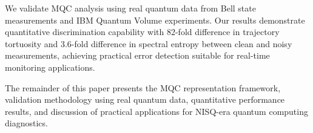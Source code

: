 We validate MQC analysis using real quantum data from Bell state measurements and IBM Quantum Volume experiments. Our results demonstrate quantitative discrimination capability with 82-fold difference in trajectory tortuosity and 3.6-fold difference in spectral entropy between clean and noisy measurements, achieving practical error detection suitable for real-time monitoring applications.

The remainder of this paper presents the MQC representation framework, validation methodology using real quantum data, quantitative performance results, and discussion of practical applications for NISQ-era quantum computing diagnostics.